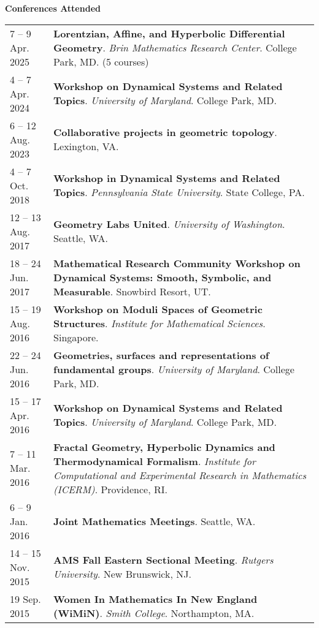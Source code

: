     \vspace{-1em}
    

    \textbf{\large Conferences Attended}
    
    \begin{center}
    {
    \renewcommand{\arraystretch}{1.5}
    \begin{longtable}{p{}  p{}}
    7  -- 9 Apr.  2025 & \textbf{Lorentzian, Affine, and Hyperbolic Differential Geometry}. \textit{Brin Mathematics Research Center}.  College Park, MD. (5 courses) \\ 
4  -- 7 Apr.  2024 & \textbf{Workshop on Dynamical Systems and Related Topics}. \textit{University of Maryland}.  College Park, MD.  \\ 
6  -- 12 Aug.  2023 & \textbf{Collaborative projects in geometric topology}.  Lexington, VA.  \\ 
4  -- 7 Oct.  2018 & \textbf{Workshop in Dynamical Systems and Related Topics}. \textit{Pennsylvania State University}.  State College, PA.  \\ 
12  -- 13 Aug.  2017 & \textbf{Geometry Labs United}. \textit{University of Washington}.  Seattle, WA.  \\ 
18  -- 24 Jun.  2017 & \textbf{Mathematical Research Community Workshop on Dynamical Systems:
Smooth, Symbolic, and Measurable}.  Snowbird Resort, UT.  \\ 
15  -- 19 Aug.  2016 & \textbf{Workshop on Moduli Spaces of Geometric Structures}. \textit{Institute for Mathematical Sciences}.  Singapore.  \\ 
22  -- 24 Jun.  2016 & \textbf{Geometries, surfaces and representations of fundamental groups}. \textit{University of Maryland}.  College Park, MD.  \\ 
15  -- 17 Apr.  2016 & \textbf{Workshop on Dynamical Systems and Related Topics}. \textit{University of Maryland}.  College Park, MD.  \\ 
7  -- 11 Mar.  2016 & \textbf{Fractal Geometry, Hyperbolic Dynamics and Thermodynamical Formalism}. \textit{Institute for Computational and Experimental Research in Mathematics (ICERM)}.  Providence, RI.  \\ 
6  -- 9 Jan.  2016 & \textbf{Joint Mathematics Meetings}.  Seattle, WA.  \\ 
14  -- 15 Nov.  2015 & \textbf{AMS Fall Eastern Sectional Meeting}. \textit{Rutgers University}.  New Brunswick, NJ.  \\ 
19 Sep.  2015 & \textbf{Women In Mathematics In New England (WiMiN)}. \textit{Smith College}.  Northampton, MA.  \\ 

\end{longtable}}
\end{center}

